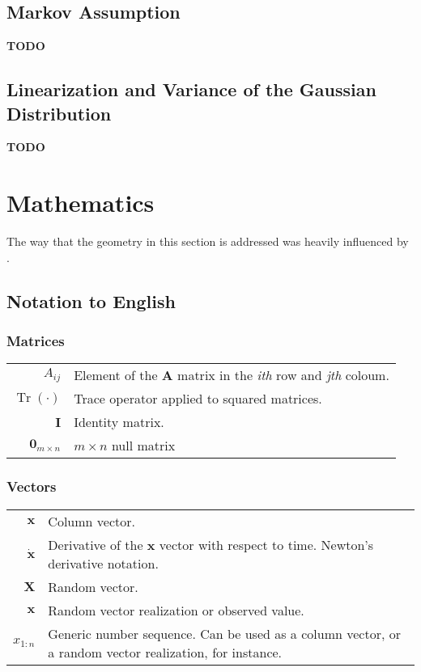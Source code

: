 \documentclass[12pt]{article}
\newcommand{\bvec}[1]{\boldsymbol{\mathbf{#1}}} %
\newcommand{\mat}[1]{\boldsymbol{\mathbf{#1}}}
\newcommand{\parentheses}[1]{\left(#1\right)}
\newcommand{\mb}[1]{{\boldsymbol{#1}}} %
\DeclareMathOperator{\Tr}{Tr}
\begin{document}
\subsection{Markov Assumption}
\color{magenta}
\textbf{TODO}
\color{black}

\subsection{Linearization and Variance of the Gaussian Distribution}
\color{magenta}
\textbf{TODO}
\color{black}

\section{Mathematics}
The way that the geometry in this section is addressed was heavily influenced by \cite{lynch2017modern}.

\subsection{Notation to English}
\subsubsection*{Matrices}
\begin{table}[h]
    \centering
    \begin{tabularx}{\textwidth}{|rX|}
        \hline
         $A_{ij}$ & Element of the $\mat{A}$ matrix in the \textit{ith} row and \textit{jth} coloum. \\
         $\Tr\parentheses{\cdot}$ & Trace operator applied to squared matrices.\\
         $\mat{I}$ & Identity matrix.  \\
         $\mat{0}_{m\times n}$ & $m\times n$ null matrix
         \\ \hline
    \end{tabularx}
    \label{tab:my_label}
\end{table}

\subsubsection*{Vectors}
\begin{table}[h]
    \centering
    \begin{tabularx}{\textwidth}{|rX|}
        \hline
         $\bvec{x}$ & Column vector.\\
         $\bvec{\dot{x}}$ & Derivative of the $\bvec{x}$ vector with respect to time. Newton's derivative notation.\\
         $\mb{X}$ & Random vector. \\
         $\mb{x}$ & Random vector realization or observed value. \\
         $x_{1:n}$ & Generic number sequence. Can be used as a column vector, or a random vector realization, for instance.
         \\ \hline
    \end{tabularx}
\end{table}
\end{document}
